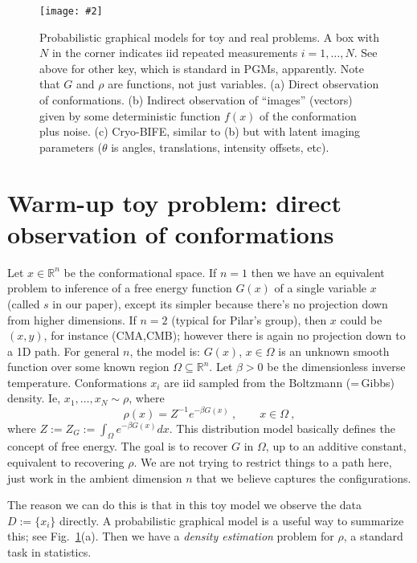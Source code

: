 \documentclass[10pt]{article}
\newcommand{\be}{\begin{equation}}
\newcommand{\ee}{\end{equation}}
\newcommand{\bfi}{\begin{figure}}
\newcommand{\efi}{\end{figure}}
\newcommand{\ca}[2]{\caption{#1 \label{#2}}}
\newcommand{\ig}[2]{\texttt{[image: \#2]}}
\newcommand{\R}{\mathbb{R}}
\newcommand{\bt}{\beta}
\begin{document}
\bfi[t]
\ig{width=6in}{graphs}
\ca{Probabilistic graphical models for toy and real problems.
  A box with $N$ in the corner indicates iid repeated measurements
  $i=1,\dots,N$. See above for other key, which is standard in PGMs, apparently.
  Note that $G$ and $\rho$ are functions, not just variables.
  (a) Direct observation of conformations. (b) Indirect observation
  of ``images'' (vectors) given by some deterministic function $f(x)$ of the conformation
  plus noise. (c) Cryo-BIFE, similar to (b) but with latent imaging parameters
  ($\theta$ is angles, translations, intensity offsets, etc).
  }{f:graphs}
\efi





\section{Warm-up toy problem: direct observation of conformations}

Let $x\in\R^n$ be the conformational space.
If $n=1$ then we have an equivalent problem to inference of a
free energy function $G(x)$ of a single variable $x$ (called $s$ in our
paper), except its simpler because there's no projection down from higher
dimensions.
If $n=2$ (typical for Pilar's group), then $x$ could be $(x,y)$, for instance (CMA,CMB); however there is again no projection down to a 1D path.
For general $n$, the model is: $G(x)$, $x\in\Omega$
is an unknown smooth function over some known
region $\Omega \subseteq \R^n$.
Let $\bt>0$ be the dimensionless inverse temperature.
Conformations $x_i$ are iid sampled from the
Boltzmann (=\,Gibbs) density. Ie, $x_1,\dots, x_N \sim \rho$, where
\be
\rho(x) = Z^{-1} e^{-\bt G(x)}~, \qquad x\in\Omega~,
\label{boltz}
\ee
where $Z := Z_G := \int_\Omega e^{-\bt G(x)} dx$.
This distribution model basically defines the concept of free energy.
The goal is to recover $G$ in $\Omega$, up to an additive constant,
equivalent to recovering $\rho$.
We are not trying to restrict things to a path here, just work in the
ambient dimension $n$ that we believe captures the configurations.

The reason we can do this is that in this toy model
we observe the data $D := \{x_i\}$ directly.
A probabilistic graphical model is a useful way to summarize this;
see Fig.~\ref{f:graphs}(a).
Then we have a {\em density estimation} problem for $\rho$,
a standard task in statistics.
\end{document}
